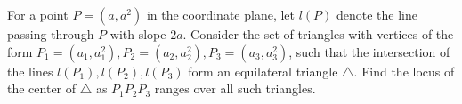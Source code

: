 For a point $P = (a,a^2)$ in the coordinate plane, let $l(P)$ denote the line passing through $P$ with slope $2a$. Consider the set of triangles with vertices of the form $P_1 = (a_1, a_1^2), P_2 = (a_2, a_2^2), P_3 = (a_3, a_3^2)$, such that the intersection of the lines $l(P_1), l(P_2), l(P_3)$ form an equilateral triangle $\triangle$. Find the locus of the center of $\triangle$ as $P_1P_2P_3$ ranges over all such triangles.